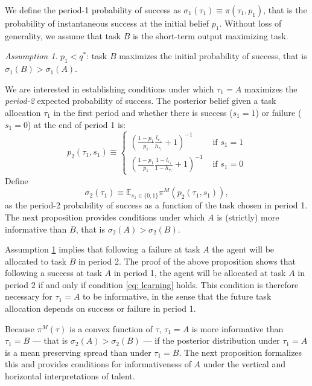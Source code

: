 \documentclass[12pt,american]{paper}
\theoremstyle{remark}
\newtheorem{ass}{Assumption}
\begin{document}
We define the period-1 probability of success as  $\sigma_1(\tau_1) \equiv \pi(\tau_1,p_1)$, that is the probability of instantaneous success at the initial belief $p_1$. Without loss of generality, we assume that task $B$ is the short-term output maximizing task.
\begin{ass}\label{ass:sigma1}
$p_1<q^*$: task $B$ maximizes the initial probability of success, that is $\sigma_1(B)>\sigma_1(A)$.
\end{ass}
We are interested in establishing conditions under which $\tau_1=A$ maximizes the \textit{period-2} expected probability of success. The posterior belief given a task allocation $\tau_1$ in the first period and whether there is success ($s_1=1$) or failure ($s_1=0$) at the end of period 1 is:
\[p_2(\tau_1,s_1)\equiv \begin{cases} 
\left(\frac{1-p_1}{p_1}\frac{l_{\tau_1}}{h_{\tau_1}}+1\right)^{-1} &\mbox{ if } s_1=1\\
\left(\frac{1-p_1}{p_1}\frac{1-l_{\tau_1}}{1-h_{\tau_1}}+1\right)^{-1} &\mbox{ if } s_1=0
\end{cases}
\]
Define  
\begin{equation*}
\sigma_2(\tau_1) \equiv \mathbb E_{s_1\in\{0,1\}}\pi^M (p_2(\tau_1,s_1)),
\end{equation*}
as the period-2 probability of success as a function of the task chosen in period 1. The next proposition provides conditions under which $A$ is (strictly) more informative than $B$, that is  $\sigma_2(A)>\sigma_2(B)$. 

 Assumption \ref{ass:sigma1} implies that following a failure at task $A$ the agent will be allocated to task $B$ in period 2. The proof of the above proposition shows that  following a success at task $A$ in period 1, the agent will be allocated at task $A$ in period $2$ if and only if condition \eqref{eq: learning} holds. This condition is therefore necessary for  $\tau_1=A$ to be informative, in the sense that the future task allocation depends on success or failure in period 1.
 
 Because $\pi^M(\tau)$ is a convex function of $\tau$,  $\tau_1=A$ is more informative than $\tau_1=B$ --- that is $\sigma_2(A)>\sigma_2(B)$ --- if the posterior distribution under $\tau_1=A$ is a mean preserving spread than under $\tau_1=B$. The next proposition formalizes this and provides conditions for informativeness of $A$ under the vertical and horizontal interpretations of talent.
\end{document}
